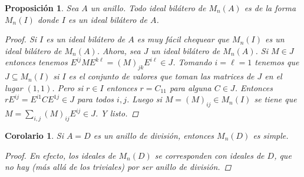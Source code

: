 \documentclass[12pt]{book}
\newtheorem{prop}[teo]{Proposición}
\newtheorem{cor}[teo]{Corolario}
\theoremstyle{definition}
\begin{document}
\begin{prop}
Sea $A$ un anillo. Todo ideal bilátero de $M_n(A)$ es de la forma $M_n(I)$ donde $I$ es un ideal bilátero de $A$.
\begin{proof}
Si $I$ es un ideal bilátero de $A$ es muy fácil chequear que $M_n(I)$ es un ideal bilátero de $M_n(A)$. Ahora, sea $J$ un ideal bilátero de $M_n(A)$. Si $M\in J$ entonces tenemos $E^{ij}ME^{k\ell} = (M)_{jk}E^{i\ell}\in J$. Tomando $i=\ell=1$ tenemos que $J\subseteq M_n(I)$ si $I$ es el conjunto de valores que toman las matrices de $J$ en el lugar $(1,1)$. Pero si $r\in I$ entonces $r=C_{11}$ para alguna $C\in J$. Entonces $rE^{ij}=E^{i1}CE^{1j}\in J$ para todos $i,j$. Luego si $M=(M)_{ij}\in M_n(I)$ se tiene que  $M=\displaystyle\sum_{i,j}(M)_{ij}E^{ij}\in J$. Y listo.
\end{proof}
\end{prop}

\begin{cor}
Si $A=D$ es un anillo de división, entonces $M_n(D)$ es simple.
\begin{proof}
En efecto, los ideales de $M_n(D)$ se corresponden con ideales de $D$, que no hay (más allá de los triviales) por ser anillo de división.
\end{proof}
\end{cor}
\end{document}
